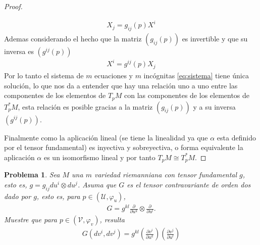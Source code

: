 \documentclass[10pt,a4paper]{report}
\newtheorem{pro}{Problema}
\begin{document}
\begin{proof}
\begin{itemize}
\begin{align}
    	X_{j} = g_{ij}(p)X^{i}\label{eq:sistema}
    \end{align}
    Ademas considerando el hecho que la matriz $(g_{ij}(p))$ es invertible y que su inversa es $(g^{ij}(p))$
    \begin{align*}
    	X^{i} = g^{ij}(p)X_{j}
    \end{align*}
    Por lo tanto el sistema de $m$ ecuaciones y $m$ incógnitas \eqref{eq:sistema} tiene única solución, lo que nos da a entender que hay una relación uno a uno entre las componentes de los elementos de $T_{p}M$ con las componentes de los elementos de $T^{*}_{p}M$, esta relación es posible gracias a la matriz $(g_{ij}(p))$ y a su inversa $(g^{ij}(p))$.
	\end{itemize}
    Finalmente como la aplicación lineal (se tiene la linealidad ya que $\alpha$ esta definido por el tensor fundamental) es inyectiva y sobreyectiva, o forma equivalente la aplicación $\alpha$ es un isomorfismo lineal y por tanto $T_{p}M \cong T^{*}_{p}M$.
\end{proof}
\begin{pro}\upshape
	Sea $M$ una $m$ variedad riemanniana con tensor fundamental $g$, esto es, $g = g_{ij}du^{i}\otimes du^{j}$. Asuma que $G$ es el tensor contravariante de orden dos dado por $g$, esto es, para $p\in (\mathcal{U},\varphi_{u})$,
	\begin{align*}
		G = g^{kl}\frac{\partial}{\partial u^{k}}\otimes\frac{\partial}{\partial u^{l}}. 
	\end{align*}
    Muestre que para $p\in(\mathcal{V},\varphi_{v})$, resulta
    \begin{align*}
    	G(dv^{i},dv^{j}) = g^{kl}\left( \frac{\partial v^{i}}{\partial u^{k}}\right) \left( \frac{\partial v^{j}}{\partial u^{l}}\right) 
    \end{align*}
\end{pro}
\end{document}
